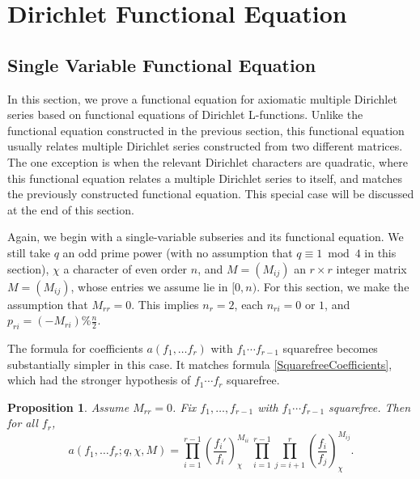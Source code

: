 \documentclass[11pt,letterpaper]{article}
\newtheorem{prop}[theorem]{Proposition}
\theoremstyle{definition}
\theoremstyle{remark}
\numberwithin{equation}{section}
\theoremstyle{dotless}
\newcommand{\res}[2]{\left(\frac{#1}{#2}\right)}
\begin{document}
\section{Dirichlet Functional Equation}\label{SectionDirichlet}
\subsection{Single Variable Functional Equation}
In this section, we prove a functional equation for axiomatic multiple Dirichlet series based on functional equations of Dirichlet L-functions. Unlike the functional equation constructed in the previous section, this functional equation usually relates multiple Dirichlet series constructed from two different matrices. The one exception is when the relevant Dirichlet characters are quadratic, where this functional equation relates a multiple Dirichlet series to itself, and matches the previously constructed functional equation. This special case will be discussed at the end of this section.

Again, we begin with a single-variable subseries and its functional equation. We still take $q$ an odd prime power (with no assumption that $q\equiv 1 \bmod 4$ in this section), $\chi$ a character of even order $n$, and $M=(M_{ij})$ an $r \times r$ integer matrix $M=(M_{ij})$, whose entries we assume lie in $[0, n)$. For this section, we make the assumption that $M_{rr} =0$. This implies $n_r=2$, each $n_{ri}=0$ or $1$, and $p_{ri}=(-M_{ri})\% \frac{n}{2}$.

The formula for coefficients $a(f_1, \ldots f_r)$ with $f_1 \cdots f_{r-1}$ squarefree becomes substantially simpler in this case. It matches formula \eqref{SquarefreeCoefficients}, which had the stronger hypothesis of $f_1 \cdots f_{r}$ squarefree.

\begin{prop} \label{PropDirichletCoeff}
Assume $M_{rr}=0$. Fix $f_1, \ldots ,f_{r-1}$ with $f_1\cdots f_{r-1}$ squarefree. Then for all $f_r$,
\begin{equation}
a(f_1, \ldots f_r; q, \chi, M)=\prod_{i=1}^{r-1} \res{f_i'}{f_i}_{\chi}^{M_{ii}} \, \prod_{i=1}^{r-1}\prod_{j=i+1}^{r} \res{f_i}{f_j}_{\chi}^{M_{ij}}.
\end{equation}
\end{prop}
\end{document}
